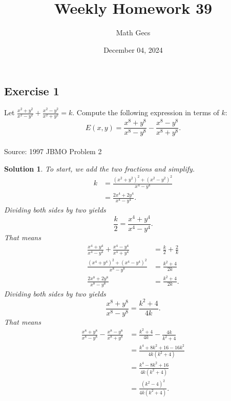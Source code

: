 \documentclass[12pt]{article}
\title{Weekly Homework 39}
\author{Math Gecs}
\date{December 04, 2024}
\newtheorem*{solution*}{Solution}
\begin{document}
\maketitle

\subsection*{Exercise 1}
Let $\frac{x^2+y^2}{x^2-y^2} + \frac{x^2-y^2}{x^2+y^2} = k$. Compute the following expression in terms of $k$:\[E(x,y) = \frac{x^8 + y^8}{x^8-y^8} - \frac{ x^8-y^8}{x^8+y^8}.\]\\

Source: 1997 JBMO Problem 2\\

\begin{solution*}
To start, we add the two fractions and simplify.\begin{align*} k &= \frac{(x^2+y^2)^2 + (x^2-y^2)^2}{x^4-y^4} \\ &= \frac{2x^4 + 2y^4}{x^4 - y^4}. \end{align*}Dividing both sides by two yields\[\frac{k}{2} = \frac{x^4 + y^4}{x^4 - y^4}.\]That means\begin{align*} \frac{x^4 + y^4}{x^4 - y^4} + \frac{x^4 - y^4}{x^4 + y^4} &= \frac{k}{2} + \frac{2}{k} \\ \frac{(x^4 + y^4)^2 + (x^4 - y^4)^2}{x^8 - y^8} &= \frac{k^2 + 4}{2k} \\ \frac{2x^8 + 2y^8}{x^8 - y^8} &= \frac{k^2 + 4}{2k}. \end{align*}Dividing both sides by two yields\[\frac{x^8 + y^8}{x^8 - y^8} = \frac{k^2 + 4}{4k}.\]That means\begin{align*} \frac{x^8 + y^8}{x^8 - y^8} - \frac{x^8 - y^8}{x^8 + y^8} &= \frac{k^2 + 4}{4k} - \frac{4k}{k^2 + 4} \\ &= \frac{k^4 + 8k^2 + 16 - 16k^2}{4k(k^2 + 4)} \\ &= \frac{k^4 - 8k^2 + 16}{4k(k^2 + 4)} \\ &= \boxed{\frac{(k^2 - 4)^2}{4k(k^2 + 4)}}. \end{align*}
\end{solution*}
\end{document}
